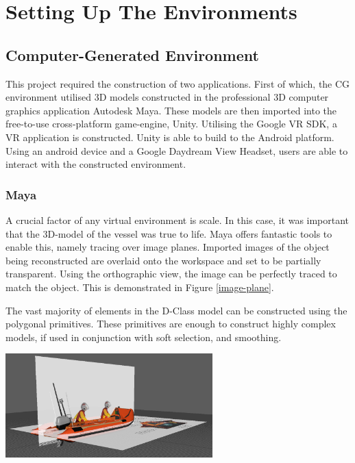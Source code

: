 \documentclass[a4paper, openright, twoside]{report}
\begin{document}
\section{Setting Up The Environments}
\subsection{Computer-Generated Environment}
This project required the construction of two applications. First of which, the CG environment utilised 3D models constructed in the professional 3D computer graphics application Autodesk Maya. These models are then imported into the free-to-use cross-platform game-engine, Unity. Utilising the Google VR SDK, a VR application is constructed. Unity is able to build to the Android platform. Using an android device and a Google Daydream View Headset, users are able to interact with the constructed environment.

\subsubsection{Maya}
A crucial factor of any virtual environment is scale. In this case, it was important that the 3D-model of the vessel was true to life. Maya offers fantastic tools to enable this, namely tracing over image planes. Imported images of the object being reconstructed are overlaid onto the workspace and set to be partially transparent. Using the orthographic view, the image can be perfectly traced to match the object. This is demonstrated in Figure \ref{image-plane}. 

The vast majority of elements in the D-Class model can be constructed using the polygonal primitives. These primitives are enough to construct highly complex models, if used in conjunction with soft selection, and smoothing.

\begin{center}
\hfill \break
\includegraphics[width=0.6\textwidth]{images/image_planes}
\label{image-plane}
\hfill \break
\end{center}
\end{document}
